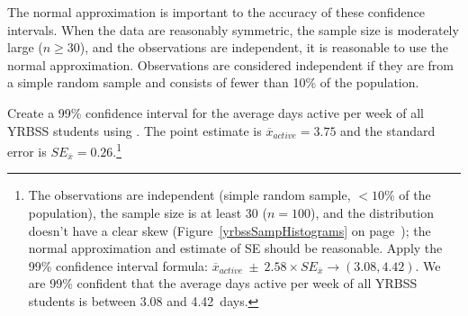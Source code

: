 \begin{spacing}{1.5}
 
The normal approximation is important to the accuracy of these confidence intervals. When the data are reasonably symmetric, the sample size is moderately large ($n \geq 30$), and the observations are independent, it is reasonable to use the normal approximation. Observations are considered independent if they are from a simple random sample and consists of fewer than 10\% of the population. 


\begin{exercise} \label{find99CIForYrbssAgeExercise}
	Create a 99\% confidence interval for the average days active per week of all YRBSS students using . The point estimate is $\overline{x}_{active} = 3.75$ and the standard error is $SE_{\overline{x}} = 0.26$.\footnote{The observations are independent (simple random sample, $<10\%$ of the population), the sample size is at least 30 ($n = 100$), and the distribution doesn't have a clear skew (Figure~\ref{yrbssSampHistograms} on page~\pageref{yrbssSampHistograms}); the normal approximation and estimate of SE should be reasonable. Apply the 99\% confidence interval formula: $\overline{x}_{active}\ \pm\ 2.58 \times  SE_{\overline{x}} \rightarrow (3.08, 4.42)$. We are 99\% confident that the average days active per week of all YRBSS students is between 3.08 and 4.42~days.}
\end{exercise}

\end{spacing}
